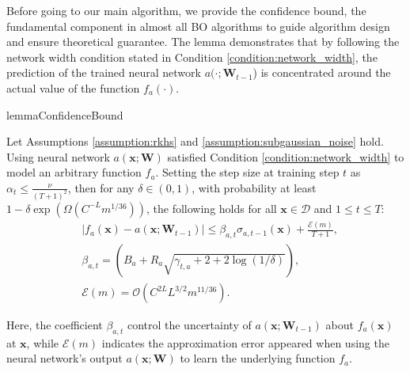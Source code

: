 Before going to our main algorithm, we provide the confidence bound, the fundamental component in almost all BO algorithms to guide algorithm design and ensure theoretical guarantee. The lemma demonstrates that by following the network width condition stated in Condition \ref{condition:network_width},  the prediction of the trained neural network $a(\cdot;\mathbf{W}_{t-1}$) is concentrated around the actual value of the function $f_a(\cdot)$. 
\begin{restatable}{lemma}{ConfidenceBound}

\label{lemma:neural-cbo_confidence_bound}
Let Assumptions \ref{assumption:rkhs} and \ref{assumption:subgaussian_noise} hold. Using neural network $a(\mathbf{x}; \mathbf{W})$ satisfied Condition \ref{condition:network_width} to model an arbitrary function $f_a$. Setting the step size at training step $t$ as $\alpha_t \le \frac{\nu}{(T+1)^2}$, then for any $\delta \in (0,1)$,  with probability at least $1 - \delta \exp (\Omega(C^{-L} m^{1/36}))$, the following holds for all $\mathbf{x} \in \mathcal{D}$ and $1 \le t \le T$:
\begin{align*}
     & \lvert f_a(\mathbf{x}) - a(\mathbf{x}; \mathbf{W}_{t-1}) \rvert 
    \le \beta_{a,t} \sigma_{a, t-1}(\mathbf{x}) + \frac{\mathcal{E}(m)}{T+1},
    \\
    & \beta_{a,t} = \left(B_a + R_a \sqrt{\gamma_{t,a} + 2 + 2 \log(1/\delta)}\right),
    \\
    & \mathcal{E}(m) = \mathcal{O}(C^{2L} L^{3/2} m^{11/36}).
\end{align*}
\end{restatable}
Here, the coefficient $\beta_{a,t}$ control the uncertainty of $a(\mathbf{x}; \mathbf{W}_{t-1})$ about $f_a(\mathbf{x})$ at $\mathbf{x}$, while $ \mathcal{E}(m)$ indicates the approximation error appeared when using the neural network's output $a(\mathbf{x}; \boldsymbol{W})$ to learn the underlying function $f_a$.     

